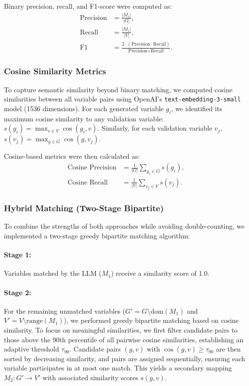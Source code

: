 Binary precision, recall, and F1-score were computed as:
\begin{align*}
\text{Precision} &= \frac{|M_1|}{|G|}, \\
\text{Recall} &= \frac{|M_1|}{|V|}, \\
\text{F1} &= \frac{2 \cdot (\text{Precision} \cdot \text{Recall})}{\text{Precision} + \text{Recall}}.
\end{align*}

\subsubsection{Cosine Similarity Metrics}

To capture semantic similarity beyond binary matching, we computed cosine similarities between all variable pairs using OpenAI's \texttt{text-embedding-3-small} model (1536 dimensions). For each generated variable \(g_i\), we identified its maximum cosine similarity to any validation variable: \(s(g_i) = \max_{v \in V} \cos(g_i, v)\). Similarly, for each validation variable \(v_j\), \(s(v_j) = \max_{g \in G} \cos(g, v_j)\).

Cosine-based metrics were then calculated as:
\begin{align*}
\text{Cosine Precision} &= \frac{1}{|G|} \sum_{g_i \in G} s(g_i), \\
\text{Cosine Recall} &= \frac{1}{|V|} \sum_{v_j \in V} s(v_j).
\end{align*}

\subsubsection{Hybrid Matching (Two-Stage Bipartite)}

To combine the strengths of both approaches while avoiding double-counting, we implemented a two-stage greedy bipartite matching algorithm:

\paragraph{Stage 1:} Variables matched by the LLM (\(M_1\)) receive a similarity score of 1.0.

\paragraph{Stage 2:} For the remaining unmatched variables (\(G' = G \setminus \text{dom}(M_1)\) and \(V' = V \setminus \text{range}(M_1)\)), we performed greedy bipartite matching based on cosine similarity. To focus on meaningful similarities, we first filter candidate pairs to those above the 90th percentile of all pairwise cosine similarities, establishing an adaptive threshold \(\tau_{90}\). Candidate pairs \((g, v)\) with \(\cos(g, v) \geq \tau_{90}\) are then sorted by decreasing similarity, and pairs are assigned sequentially, ensuring each variable participates in at most one match. This yields a secondary mapping \(M_2 : G' \to V'\) with associated similarity scores \(s(g, v)\).

